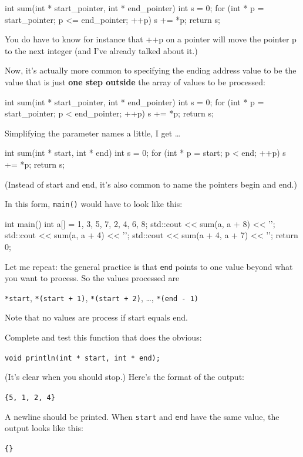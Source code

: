 \begin{consolethree}[escapeinside=||]
int sum(int * start_pointer, int * end_pointer)
{
    int s = 0;
    for (int * p = start_pointer;
         p <= end_pointer; ++p)
    {
        s += *p;
    }
    return s;
}
\end{consolethree}

You do have to know for instance that ++p on a pointer will move the
pointer p to the next integer (and I've already talked about it.)

Now, it's actually more common to specifying the ending address value to
be the value that is just \textbf{one step outside} the array of values
to be processed:

\begin{consolethree}[escapeinside=||]
int sum(int * start_pointer, int * end_pointer)
{
    int s = 0;
    for (int * p = start_pointer;
         p < end_pointer; ++p)
    {
        s += *p;
    }
    return s;
}
\end{consolethree}

Simplifying the parameter names a little, I get \ldots{}

\begin{consolethree}[escapeinside=||]
int sum(int * start, int * end)
{
    int s = 0;
    for (int * p = start; p < end; ++p)
    {
        s += *p;
    }
    return s;
}
\end{consolethree}

(Instead of start and end, it's also common to name the pointers begin
and end.)

In this form, \texttt{main()} would have to look like this:

\begin{consolethree}[escapeinside=||]
int main()
{
    int a[] = {1, 3, 5, 7, 2, 4, 6, 8};
    std::cout << sum(a, a + 8) << '\n';
    std::cout << sum(a, a + 4) << '\n';
    std::cout << sum(a + 4, a + 7) << '\n';
    return 0;
}
\end{consolethree}

Let me repeat: the general practice is that \texttt{end} points to one
value beyond what you want to process. So the values processed are

\texttt{*start}, \texttt{*(start + 1)}, \texttt{*(start + 2)}, \ldots,
\texttt{*(end - 1)}

Note that no values are process if start equals end.

\begin{ex}
Complete and test this function that does the
obvious:

\verb!void println(int * start, int * end);!

(It's clear when you should stop.) Here's the format of the output:

\verb!{5, 1, 2, 4}!

A newline should be printed. When \texttt{start} and \texttt{end} have the
same value, the output looks like this:

\verb!{}!
\end{ex}

